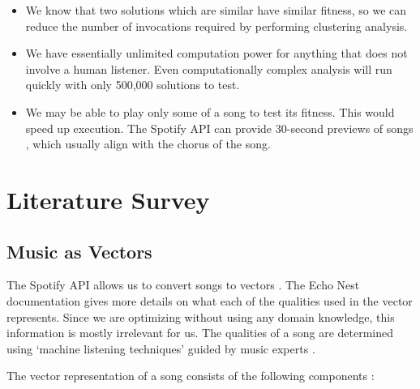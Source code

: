 \documentclass{article}
\begin{document}
	\begin{itemize}
		\item We know that two solutions which are similar have similar fitness, so we can reduce the number of invocations required by performing clustering analysis.
		\item We have essentially unlimited computation power for anything that does not involve a human listener. Even computationally complex analysis will run quickly with only 500,000 solutions to test.
		\item We may be able to play only some of a song to test its fitness. This would speed up execution. The Spotify API can provide 30-second previews of songs \cite{spotify_get_nodate-1}, which usually align with the chorus of the song.
	\end{itemize}

	\section{Literature Survey}
	
	\subsection{Music as Vectors}
	The Spotify API allows us to convert songs to vectors \cite{spotify_get_nodate}. The Echo Nest documentation gives more details on what each of the qualities used in the vector represents. Since we are optimizing without using any domain knowledge, this information is mostly irrelevant for us. The qualities of a song are determined using `machine listening techniques' guided by music experts \cite{jehan_analyzer_2014}.
	
	The vector representation of a song consists of the following components \cite{the_echo_nest_song_2011, jehan_analyzer_2014}:
	
\end{document}
